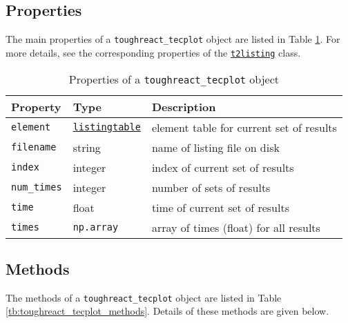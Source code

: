 \subsection{Properties}

The main properties of a \texttt{toughreact\_tecplot} object are listed in Table \ref{tb:toughreact_tecplot_properties}. For more details, see the corresponding properties of the \hyperref[t2listing_properties]{\texttt{t2listing}} class.

\begin{table}
  \begin{center}
    \begin{tabular}{|l|l|p{70mm}|}
      \hline
      \textbf{Property} & \textbf{Type} & \textbf{Description}\\
      \hline
      \texttt{element} & \hyperref[listingtableobjects]{\texttt{listingtable}} & element table for current set of results\\
      \texttt{filename} & string & name of listing file on disk\\
      \texttt{index} & integer & index of current set of results\\
      \texttt{num\_times} & integer & number of sets of results\\
      \texttt{time} & float & time of current set of results\\
      \texttt{times} & \texttt{np.array} & array of times (float) for all results\\
      \hline
    \end{tabular}
    \caption{Properties of a \texttt{toughreact\_tecplot} object}
    \label{tb:toughreact_tecplot_properties}
  \end{center}
\end{table}

\subsection{Methods}

The methods of a \texttt{toughreact\_tecplot} object are listed in Table \ref{tb:toughreact_tecplot_methods}. Details of these methods are given below.

